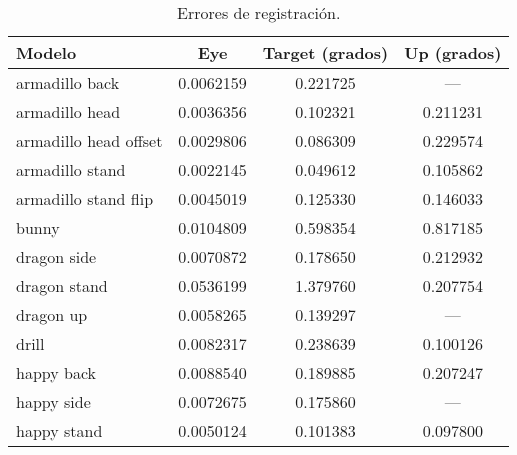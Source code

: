 \begin{table}
	\centering
	\begin{tabular}{l*{3}{c}}
		\toprule                                                                  
		Modelo                   &    Eye          &    Target (grados)        &    Up (grados)\\
		\midrule
		armadillo back          &     0.0062159   &   0.221725     &    ---\\        
		armadillo head          &     0.0036356  &    0.102321     &    0.211231\\   
		armadillo head offset   &     0.0029806  &    0.086309     &    0.229574\\   
		armadillo stand         &     0.0022145  &    0.049612     &    0.105862\\   
		armadillo stand flip    &     0.0045019  &    0.125330     &    0.146033\\   
		\midrule
		bunny                   &     0.0104809   &   0.598354     &    0.817185\\   
		\midrule
		dragon side             &     0.0070872  &    0.178650     &    0.212932\\   
		dragon stand            &     0.0536199   &   1.379760     &    0.207754\\   
		dragon up               &     0.0058265  &    0.139297     &    ---\\        
		\midrule
		drill                   &     0.0082317  &    0.238639     &    0.100126\\   
		\midrule
		happy back              &     0.0088540  &    0.189885     &    0.207247\\   
		happy side              &     0.0072675   &   0.175860     &    ---\\        
		happy stand             &     0.0050124  &    0.101383     &    0.097800\\  
		\bottomrule                                                               
	\end{tabular}
	\caption[Errores de registración]{\label{tab:reg_error}Errores de registración.}
\end{table}
